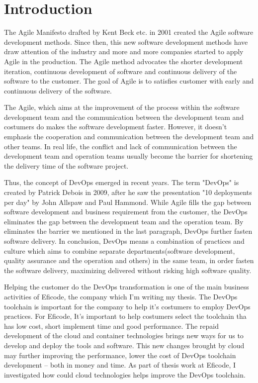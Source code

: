 \chapter{Introduction}
\label{chp:introduction}
The Agile Manifesto drafted by Kent Beck etc. in 2001 created the Agile software development methods\cite{beck2001manifesto}. Since then, this new software development methods have draw attention of the industry and more and more companies started to apply Agile in the production.
The Agile method advocates the shorter development iteration, continuous development of software and continuous delivery of the software to the customer. The goal of Agile is to satisfies customer with early and continuous delivery of the software.\cite{beck2001manifesto} 
\par
The Agile, which aims at the improvement of the process within the software development team and the communication between the development team and costumers \cite{miglierina2014application} do makes the software development faster. However, it doesn't emphasis the cooperation and communication between the development team and other teams. In real life, the conflict and lack of communication between the development team and operation teams usually become the barrier for shortening the delivery time of the software project.
\par
Thus, the concept of DevOps emerged in recent years. The term "DevOps" is created by Patrick Debois in 2009, after he saw the presentation "10 deployments per day" by John Allspaw and Paul Hammond.\cite{kim2016devops} While Agile fills the gap between software development and business requirement from the customer, the DevOps eliminates the gap between the development team and the operation team. \cite{WhatisaD20:online} By eliminates the barrier we mentioned in the last paragraph, DevOps further fasten software delivery. In conclusion,
DevOps means a combination of practices and culture which aims to combine separate departments(software development, quality assurance and the operation and others) in the same team, in order fasten the software delivery, maximizing delivered without risking high software quality. \cite{DevOpsWi87:online}\cite{ebert2016devops} 
\par
Helping the customer do the DevOps transformation is one of the main business activities of Eficode, the company which I'm writing my thesis. The DevOps toolchain is important for the company to help it's costumers to employ DevOps practices. For Eficode, It's important to help costumers select the toolchain tha has low cost, short implement time and good performance. 
The repaid development of the cloud and container technologies brings new ways for us to develop and deploy the tools and software. This new changes brought by cloud may further improving the performance, lower the cost of DevOps toolchain development -- both in money and time. As part of thesis work at Eficode, I investigated how could cloud technologies helps improve the DevOps toolchain. 
